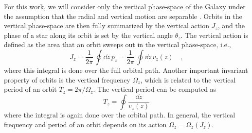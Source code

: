 For this work, we will consider only the vertical phase-space of the Galaxy under the
assumption that the radial and vertical motion are separable \citep[see also,
e.g.,][]{Oort:1932, Bahcall:1984,Kuijken:1989b, Kuijken:1991, Holmberg:2000, Li:2021,
Green:2023}.
Orbits in the vertical phase-space are then fully summarized by the vertical action
$J_z$, and the phase of a star along its orbit is set by the vertical angle $\theta_z$.
The vertical action is defined as the area that an orbit sweeps out in the vertical
phase-space, i.e.,
\begin{equation}
    J_z = \frac{1}{2\pi} \, \oint \dd z \, p_z =
        \frac{1}{2\pi} \, \oint \dd z \, v_z(z) \quad, \label{eq:Jz}
\end{equation}
where this integral is done over the full orbital path.
Another important invariant property of orbits is the vertical frequency $\Omega_z$,
which is related to the vertical period of an orbit $T_z = 2\pi / \Omega_z$.
The vertical period can be computed as
\begin{equation}
    T_z = \oint \frac{\dd z}{v_z(z)} \label{eq:Tz}
\end{equation}
where the integral is again done over the orbital path.
In general, the vertical frequency and period of an orbit depends on its action
$\Omega_z = \Omega_z(J_z)$.







